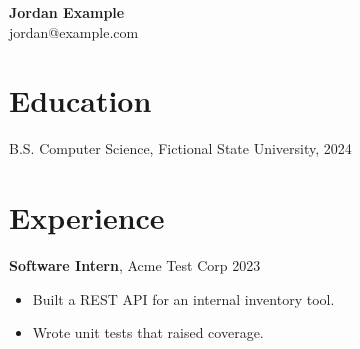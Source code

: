 \documentclass[10pt]{article}
\begin{document}
\begin{center}{\Large \textbf{Jordan Example}}\\ jordan@example.com\end{center}
\section*{Education}
B.S. Computer Science, Fictional State University, 2024
\section*{Experience}
\textbf{Software Intern}, Acme Test Corp \hfill 2023
\begin{itemize}
  \item Built a REST API for an internal inventory tool.
  \item Wrote unit tests that raised coverage.
\end{itemize}
\end{document}
